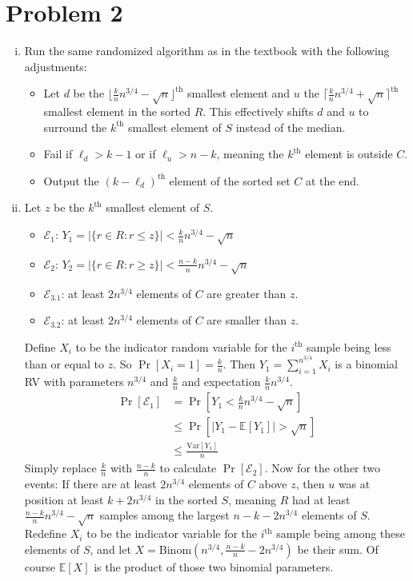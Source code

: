 \documentclass[11pt]{article}
\newcommand{\E}{\mathbb{E}}
\newcommand{\emf}{\mathcal{E}}
\newcommand{\Var}{\text{Var}}
\begin{document}
\newpage
\section*{Problem 2}
\begin{enumerate}[(i)]
\item Run the same randomized algorithm as in the textbook with the following adjustments: \begin{itemize}
\item Let $d$ be the $\lfloor\frac knn^{3/4}-\sqrt n\rfloor^{\text{th}}$ smallest element and $u$ the $\lceil\frac knn^{3/4}+\sqrt n\rceil^{\text{th}}$ smallest element in the sorted $R$. This effectively shifts $d$ and $u$ to surround the $k^{\text{th}}$ smallest element of $S$ instead of the median.
\item Fail if $\ell_d>k-1$ or if $\ell_u>n-k$, meaning the $k^{\text{th}}$ element is outside $C$.
\item Output the $(k-\ell_d)^{\text{th}}$ element of the sorted set $C$ at the end.
\end{itemize}
\item Let $z$ be the $k^{\text{th}}$ smallest element of $S$.\begin{itemize}
\item $\emf_1$: $Y_1=|\{r\in R : r\leq z\}| < \frac knn^{3/4}-\sqrt n$
\item $\emf_2$: $Y_2=|\{r\in R : r\geq z\}| < \frac {n-k}nn^{3/4}-\sqrt n$
\item $\emf_{3.1}$: at least $2n^{3/4}$ elements of $C$ are greater than $z$.
\item $\emf_{3.2}$: at least $2n^{3/4}$ elements of $C$ are smaller than $z$.
\end{itemize}
Define $X_i$ to be the indicator random variable for the $i^{\text{th}}$ sample being less than or equal to $z$. So $\Pr[X_i=1]=\frac kn$. Then $Y_1=\sum_{i=1}^{n^{3/4}} X_i$ is a binomial RV with parameters $n^{3/4}$ and $\frac kn$ and expectation $\frac knn^{3/4}$. \begin{align*}
\Pr[\emf_1] &= \Pr[Y_1 < \frac knn^{3/4}-\sqrt n]\\
&\leq \Pr[|Y_1-\E[Y_1]| > \sqrt n]\\
&\leq \frac{\Var[Y_1]}n
\end{align*}
Simply replace $\frac kn$ with $\frac{n-k}n$ to calculate $\Pr[\emf_2]$. Now for the other two events: If there are at least $2n^{3/4}$ elements of $C$ above $z$, then $u$ was at position at least $k+2n^{3/4}$ in the sorted $S$, meaning $R$ had at least $\frac {n-k}nn^{3/4}-\sqrt n$ samples among the largest $n-k-2n^{3/4}$ elements of $S$. Redefine $X_i$ to be the indicator variable for the $i^{\text{th}}$ sample being among these elements of $S$, and let $X=\text{Binom}(n^{3/4}, \frac{n-k}n-2n^{3/4})$ be their sum. Of course $\E[X]$ is the product of those two binomial parameters. \begin{align*}

\end{align*}
\end{enumerate}
\end{document}
